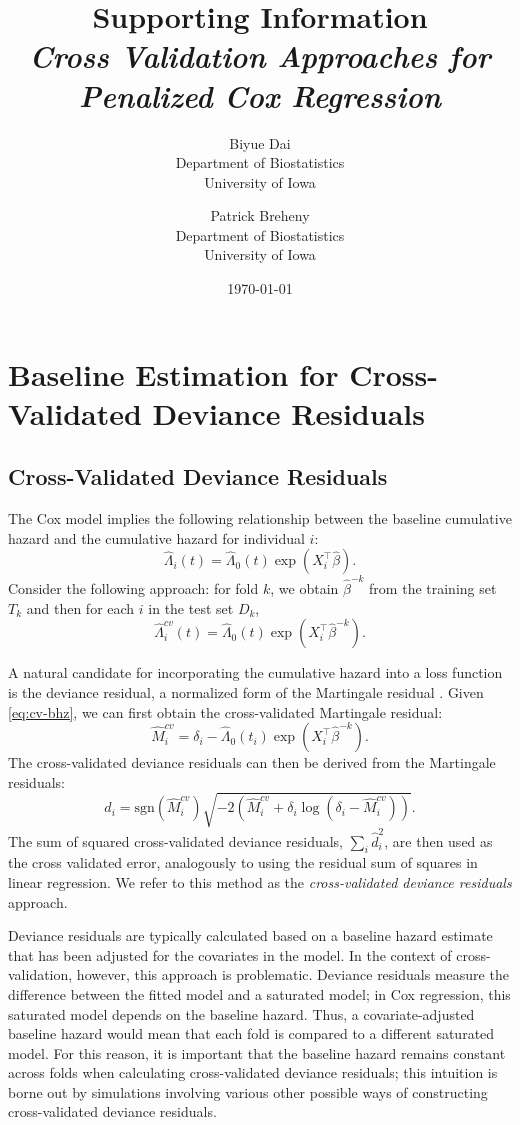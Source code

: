 \documentclass{article}
\title{Supporting Information\\
\textit{Cross Validation Approaches for Penalized Cox Regression}}
\author{Biyue Dai\\Department of Biostatistics\\University of Iowa
  \and
  Patrick Breheny\\Department of Biostatistics\\University of Iowa}
\date{\today}
\providecommand{\Tr}{^{\scriptscriptstyle\top}}
\begin{document}
\maketitle

\section{Baseline Estimation for Cross-Validated Deviance Residuals}
\subsection{Cross-Validated Deviance Residuals}
The Cox model implies the following relationship between the baseline cumulative hazard and the cumulative hazard for individual $i$:
\begin{equation}
  \hat{\Lambda}_{i}(t) =  \hat{\Lambda}_{0}(t)\exp(X_i\Tr\hat\beta).
\end{equation}
Consider the following approach: for fold $k$, we obtain $\hat{\beta}^{-k}$ from the training set $T_k$ and then for each $i$ in the test set $D_k$, 
\begin{equation}
 \label{eq:cv-bhz}
  \hat{\Lambda}^{cv}_{i}(t) =  \hat{\Lambda}_{0}(t)\exp(X_i\Tr\hat\beta^{-k}).
\end{equation}

A natural candidate for incorporating the cumulative hazard into a loss function is the deviance residual, a normalized form of the Martingale residual \citep{Therneau1990}.  Given \eqref{eq:cv-bhz}, we can first obtain the cross-validated Martingale residual: 
\begin{equation}
  \hat{M}^{cv}_{i} = \delta_{i} - \hat{\Lambda}_{0}(t_{i})\exp(X_i\Tr\hat\beta^{-k}).
\end{equation}
The cross-validated deviance residuals can then be derived from the Martingale residuals: 
\begin{equation} 
  d_{i} = \text{sgn}(\hat{M}^{cv}_{i})\sqrt{-2(\hat{M}^{cv}_{i} + \delta_{i}\log(\delta_{i} - \hat{M}^{cv}_{i}))}.
\end{equation}
The sum of squared cross-validated deviance residuals, $\sum_{i}\hat{d}_{i}^2$, are then used as the cross validated error, analogously to using the residual sum of squares in linear regression. We refer to this method as the \emph{cross-validated deviance residuals} approach.

Deviance residuals are typically calculated based on a baseline hazard estimate that has been adjusted for the covariates in the model. In the context of cross-validation, however, this approach is problematic. Deviance residuals measure the difference between the fitted model and a saturated model; in Cox regression, this saturated model depends on the baseline hazard. Thus, a covariate-adjusted baseline hazard would mean that each fold is compared to a different saturated model. For this reason, it is important that the baseline hazard remains constant across folds when calculating cross-validated deviance residuals; this intuition is borne out by simulations involving various other possible ways of constructing cross-validated deviance residuals.  
\end{document}
